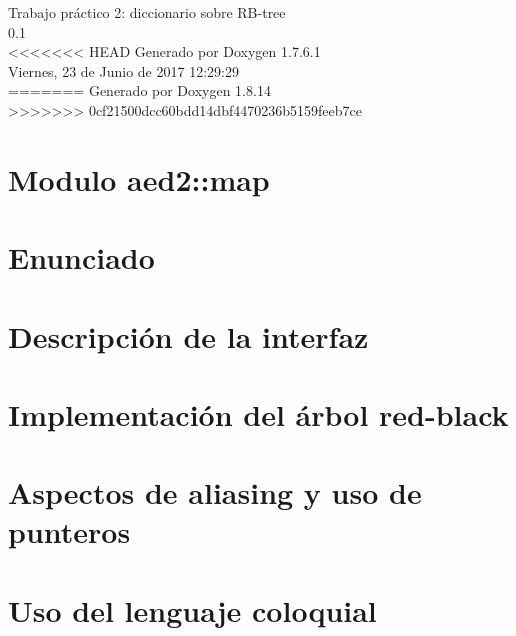 \documentclass[twoside]{article}
\newcommand{\+}{\discretionary{\mbox{\scriptsize$\hookleftarrow$}}{}{}}
\begin{document}
\hypersetup{pageanchor=false,
             bookmarksnumbered=true,
             pdfencoding=unicode
            }
\begin{titlepage}
\vspace*{7cm}
\begin{center}%
{\Large Trabajo práctico 2\+: diccionario sobre R\+B-\/tree \\[1ex]\large 0.\+1 }\\
\vspace*{1cm}
<<<<<<< HEAD
{\large \-Generado por Doxygen 1.7.6.1}\\
\vspace*{0.5cm}
{\small Viernes, 23 de Junio de 2017 12:29:29}\\
=======
{\large Generado por Doxygen 1.8.14}\\
>>>>>>> 0cf21500dcc60bdd14dbf4470236b5159feeb7ce
\end{center}
\end{titlepage}
\tableofcontents
{}
\hypersetup{pageanchor=true}

\section{Modulo aed2\+:\+:map}
\label{index}\hypertarget{index}{}
\section{Enunciado}
\label{Enunciado}

\section{Descripción de la interfaz}
\label{Interfaz}

\section{Implementación del árbol red-\/black}
\label{Implementacion}

\section{Aspectos de aliasing y uso de punteros}
\label{Aliasing}

\section{Uso del lenguaje coloquial}
\label{Castellano}

\end{document}
